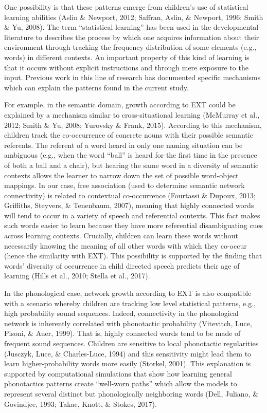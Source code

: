 \documentclass[english,floatsintext,man]{apa6}
\theoremstyle{definition}
\theoremstyle{definition}
\theoremstyle{definition}
\theoremstyle{remark}
\begin{document}
One possibility is that these patterns emerge from children's use of
statistical learning abilities (Aslin \& Newport, 2012; Saffran, Aslin,
\& Newport, 1996; Smith \& Yu, 2008). The term \enquote{statistical
learning} has been used in the developmental literature to describes the
process by which one acquires information about their environment
through tracking the frequency distribution of some elements (e.g.,
words) in different contexts. An important property of this kind of
learning is that it occurs without explicit instructions and through
mere exposure to the input. Previous work in this line of research has
documented specific mechanisms which can explain the patterns found in
the current study.

For example, in the semantic domain, growth according to EXT could be
explained by a mechanism similar to cross-situational learning (McMurray
et al., 2012; Smith \& Yu, 2008; Yurovsky \& Frank, 2015). According to
this mechanism, children track the co-occurrence of concrete nouns with
their possible semantic referents. The referent of a word heard in only
one naming situation can be ambiguous (e.g., when the word
\enquote{ball} is heard for the first time in the presence of both a
ball and a chair), but hearing the same word in a diversity of semantic
contexts allows the learner to narrow down the set of possible
word-object mappings. In our case, free association (used to determine
semantic network connectivity) is related to contextual co-occurrence
(Fourtassi \& Dupoux, 2013; Griffiths, Steyvers, \& Tenenbaum, 2007),
meaning that highly connected words will tend to occur in a variety of
speech and referential contexts. This fact makes such words easier to
learn because they have more referential disambiguating cues across
learning contexts. Crucially, children can learn these words without
necessarily knowing the meaning of all other words with which they
co-occur (hence the similarity with EXT). This possibility is supported
by the finding that words' diversity of occurrence in child directed
speech predicts their age of learning (Hills et al., 2010; Stella et
al., 2017).

In the phonological case, network growth according to EXT is also
compatible with a scenario whereby children are tracking low level
statistical patterns, e.g., high probability sound sequences. Indeed,
connectivity in the phonological network is inherently correlated with
phonotactic probability (Vitevitch, Luce, Pisoni, \& Auer, 1999). That
is, highly connected words tend to be made of frequent sound sequences.
Children are sensitive to local phonotactic regularities (Jusczyk, Luce,
\& Charles-Luce, 1994) and this sensitivity might lead them to learn
higher-probability words more easily (Storkel, 2001). This explanation
is supported by computational simulations that show how learning general
phonotactics patterns create \enquote{well-worn paths} which allow the
models to represent several distinct but phonologically neighboring
words (Dell, Juliano, \& Govindjee, 1993; Takac, Knott, \& Stokes,
2017).
\end{document}
